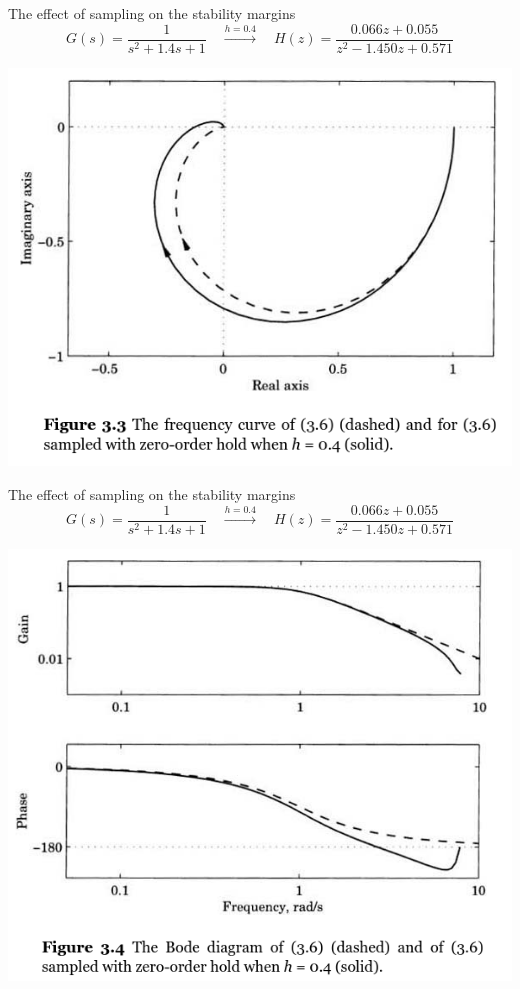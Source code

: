 \documentclass[presentation,aspectratio=169]{beamer}
\begin{document}
\begin{frame}[label={sec:org9f53c4b}]{The effect of sampling on the stability margins}
\[G(s) = \frac{1}{s^2 + 1.4s + 1} \quad \overset{h=0.4}{\longrightarrow} \quad H(z) = \frac{0.066z + 0.055}{z^2 - 1.450z + 0.571}\] 
\begin{center}
\includegraphics[width=0.6\linewidth]{../../figures/fig3-3.png}
\end{center}
\end{frame}
\begin{frame}[label={sec:org397e395}]{The effect of sampling on the stability margins}
\[G(s) = \frac{1}{s^2 + 1.4s + 1} \quad \overset{h=0.4}{\longrightarrow} \quad H(z) = \frac{0.066z + 0.055}{z^2 - 1.450z + 0.571}\] 
\begin{center}
\includegraphics[width=0.5\linewidth]{../../figures/fig3-4.png}
\end{center}
\end{frame}
\end{document}
